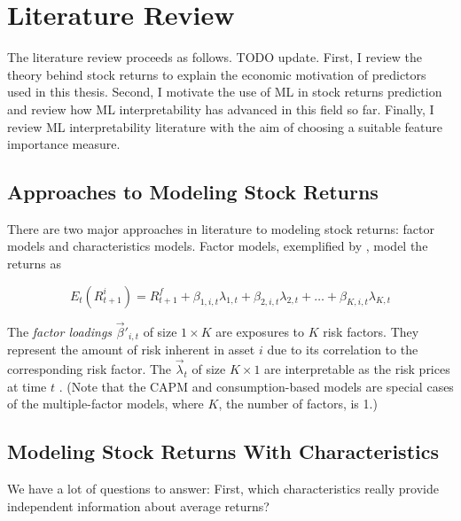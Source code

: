 \chapter{Literature Review}
\label{chap:lit} 
		 	
 	The literature review proceeds as follows. TODO update. First, I review the theory behind stock returns to explain the economic motivation of predictors used in this thesis. Second, I motivate the use of ML in stock returns prediction and review how ML interpretability has advanced in this field so far. Finally, I review ML interpretability literature with the aim of choosing a suitable feature importance measure.
 	
 	\section {Approaches to Modeling Stock Returns}
 	
 	There are two major approaches in literature to modeling stock returns: factor models and characteristics models. Factor models, exemplified by \cite{fama1996multifactor, fama2015five}, model the returns as  
 	
 	\begin{equation}
 		E_t(R^i_{t+1}) = R^f_{t+1} + \beta_{1,i,t} \lambda_{1,t} + \beta_{2,i,t} \lambda_{2,t} + \ldots +  \beta_{K,i,t} \lambda_{K,t} 
 	\end{equation}
 	
 	The \textit{factor loadings} $\vec{\beta}'_{i,t}$ of size $1\times K$ are exposures to $K$ risk factors.  They represent the amount of risk inherent in asset $i$ due to its correlation to the corresponding risk factor. The $\vec{\lambda}_{t}$ of size $K \times 1$ are interpretable as the risk prices at time $t$ \citep{kelly2019characteristics}. (Note that the CAPM and consumption-based models are special cases of the multiple-factor models, where $K$, the number of factors, is 1.) 
 	
 	
 	
 	\section{Modeling Stock Returns With Characteristics}
	 	
	 	\setlength{\epigraphwidth}{0.8\textwidth}
	 	\epigraph{We have a lot of questions to answer: First, which characteristics really provide	independent information about average returns?}{\cite{cochrane2011presidential}}
			
